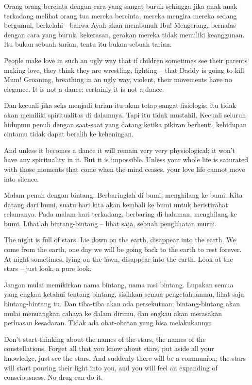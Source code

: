 \bahasa
Orang-orang bercinta dengan cara yang sangat buruk sehingga jika anak-anak terkadang melihat orang tua mereka bercinta, mereka mengira mereka sedang bergumul, berkelahi - bahwa Ayah akan membunuh Ibu! Mengerang, bernafas dengan cara yang buruk, kekerasan, gerakan mereka tidak memiliki keanggunan. Itu bukan sebuah tarian; tentu itu bukan sebuah tarian.

\english
People make love in such an ugly way that if children sometimes see their parents making love, they think they are wrestling, fighting -- that Daddy is going to kill Mum! Groaning, breathing in an ugly way, violent, their movements have no elegance. It is not a dance; certainly it is not a dance.

\bahasa
Dan kecuali jika seks menjadi tarian itu akan tetap sangat fisiologis; itu tidak akan memiliki spiritualitas di dalamnya. Tapi itu tidak mustahil. Kecuali seluruh hidupmu penuh dengan saat-saat yang datang ketika pikiran berhenti, kehidupan cintamu tidak dapat beralih ke keheningan.

\english
And unless it becomes a dance it will remain very very physiological; it won't have any spirituality in it. But it is impossible. Unless your whole life is saturated with those moments that come when the mind ceases, your love life cannot move into silence.

\bahasa
Malam penuh dengan bintang. Berbaringlah di bumi, menghilang ke bumi. Kita datang dari bumi, suatu hari kita akan kembali ke bumi untuk beristirahat selamanya. Pada malam hari terkadang, berbaring di halaman, menghilang ke bumi. Lihatlah bintang-bintang -- lihat saja, sebuah penglihatan murni.

\english
The night is full of stars. Lie down on the earth, disappear into the earth. We come from the earth, one day we will be going back to the earth to rest forever. At night sometimes, lying on the lawn, disappear into the earth. Look at the stars -- just look, a pure look.

\bahasa
Jangan mulai memikirkan nama bintang, nama rasi bintang. Lupakan semua yang engkau ketahui tentang bintang, sisihkan semua pengetahuanmu, lihat saja bintang-bintang tu. Dan tiba-tiba akan ada persekutuan; bintang-bintang akan mulai menuangkan cahaya ke dalam dirimu, dan engkau akan merasakan perluasan kesadaran. Tidak ada obat-obatan yang bisa melakukannya.

\english
Don't start thinking about the names of the stars, the names of the constellations. Forget all that you know about stars, put aside all your knowledge, just see the stars. And suddenly there will be a communion; the stars will start pouring their light into you, and you will feel an expanding of consciousness. No drug can do it.


